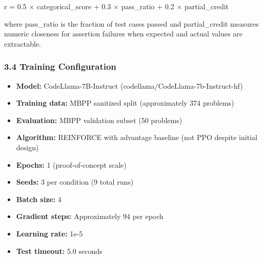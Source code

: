 r = 0.5 $\times$ categorical\_score + 0.3 $\times$ pass\_ratio + 0.2 $\times$ partial\_credit

where pass\_ratio is the fraction of test cases passed and partial\_credit measures numeric closeness for assertion failures when expected and actual values are extractable.

\subsubsection{3.4 Training Configuration}

\begin{itemize}
\item \textbf{Model:} CodeLlama-7B-Instruct (codellama/CodeLlama-7b-Instruct-hf)
\item \textbf{Training data:} MBPP sanitized split (approximately 374 problems)
\item \textbf{Evaluation:} MBPP validation subset (50 problems)
\item \textbf{Algorithm:} REINFORCE with advantage baseline (not PPO despite initial design)
\item \textbf{Epochs:} 1 (proof-of-concept scale)
\item \textbf{Seeds:} 3 per condition (9 total runs)
\item \textbf{Batch size:} 4
\item \textbf{Gradient steps:} Approximately 94 per epoch
\item \textbf{Learning rate:} 1e-5
\item \textbf{Test timeout:} 5.0 seconds
\end{itemize}
